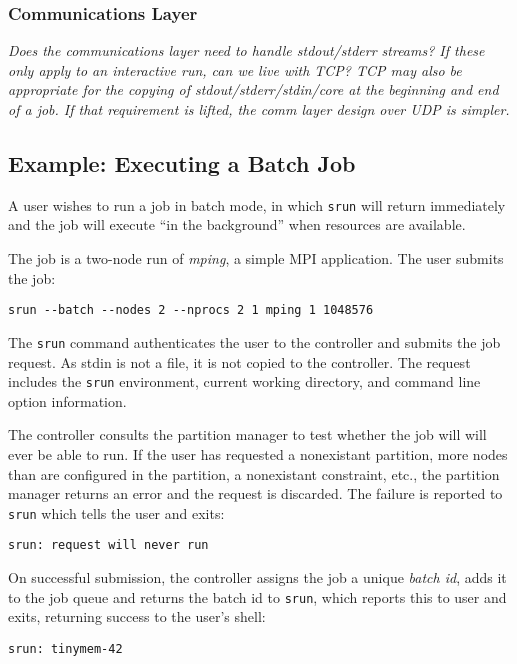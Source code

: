 \subsubsection{Communications Layer}

{\em Does the communications layer need to handle stdout/stderr streams?
If these only apply to an interactive run, can we live with TCP?
TCP may also be appropriate for the copying of stdout/stderr/stdin/core
at the beginning and end of a job.  If that requirement is lifted,
the comm layer design over UDP is simpler.}

\subsection{Example:  Executing a Batch Job}

A user wishes to run a job in batch mode, in which {\tt srun} will return 
immediately and the job will execute ``in the background'' when resources
are available.

The job is a two-node run of {\em mping}, a simple MPI application.
The user submits the job:
\begin{verbatim}
srun --batch --nodes 2 --nprocs 2 1 mping 1 1048576
\end{verbatim}

The {\tt srun} command authenticates the user to the controller and submits
the job request.  As stdin is not a file, it is not copied to the controller.
The request includes the {\tt srun} environment, current working directory, 
and command line option information.

The controller consults the partition manager to test whether the job will
will ever be able to run.  If the user has requested a nonexistant partition,
more nodes than are configured in the partition, a nonexistant constraint, 
etc., the partition manager returns an error and the request is discarded.
The failure is reported to {\tt srun} which tells the user and exits:
\begin{verbatim}
srun: request will never run
\end{verbatim}

On successful submission, the controller assigns the job a unique 
{\em batch id}, adds it to the job queue and returns the 
batch id to {\tt srun}, which reports this to user and exits, returning
success to the user's shell:

\begin{verbatim}
srun: tinymem-42
\end{verbatim}

